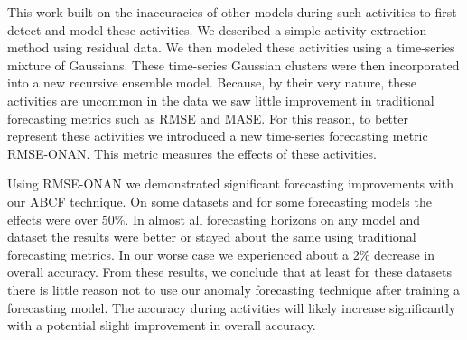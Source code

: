 This work built on the inaccuracies of other models during such activities to first detect and model these activities.  We described a simple activity extraction method using residual data.  We then modeled these activities using a time-series mixture of Gaussians.  These time-series Gaussian clusters were then incorporated into a new recursive ensemble model.  Because, by their very nature, these activities are uncommon in the data we saw little improvement in traditional forecasting metrics such as RMSE and MASE.  For this reason, to better represent these activities we introduced a new time-series forecasting metric RMSE-ONAN.  This metric measures the effects of these activities.  

Using RMSE-ONAN we demonstrated significant forecasting improvements with our ABCF technique.  On some datasets and for some forecasting models the effects were over 50\%.  In almost all forecasting horizons on any model and dataset the results were better or stayed about the same using traditional forecasting metrics.  In our worse case we experienced about a 2\% decrease in overall accuracy.  From these results, we conclude that at least for these datasets there is little reason not to use our anomaly forecasting technique after training a forecasting model.  The accuracy during activities will likely increase significantly with a potential slight improvement in overall accuracy.